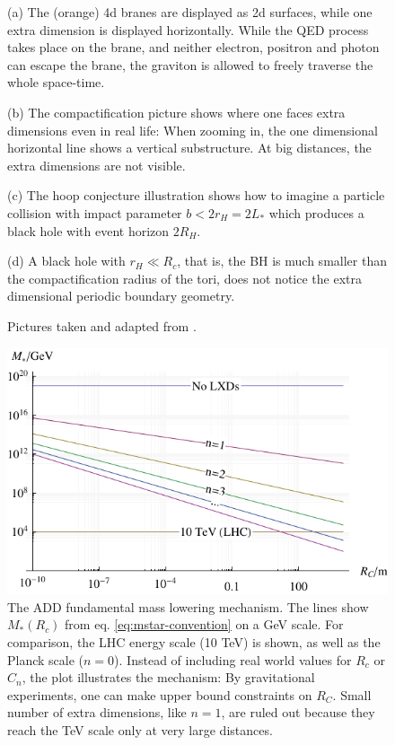 \documentclass[12pt,a4paper]{report}
\numberwithin{equation}{chapter}
\begin{document}
\begin{figure}[h!]
{(a) The (orange) 4d branes are displayed as 2d surfaces, while one extra dimension is displayed horizontally. While the QED process takes place on the brane, and neither electron, positron and photon can escape the brane, the graviton is allowed to freely traverse the whole space-time.

(b) The compactification picture shows where one faces extra dimensions even in real life: When zooming in, the one dimensional horizontal line shows a vertical substructure. At big distances, the extra dimensions are not visible.

(c) The hoop conjecture illustration shows how to imagine a particle collision with impact parameter $b<2 r_H=2 L_*$ which produces a black hole with event horizon $2R_H$.

(d) A black hole with $r_H \ll R_c$, that is, the BH is much smaller than the compactification radius of the tori, does not notice the extra dimensional periodic boundary geometry.

Pictures taken and adapted from \cite{KBH2005,cavaglia,Hossenfelder2004}.}\label{fig:lxd-1}
\end{figure}

\begin{figure}
\centering
\includegraphics[scale=1]{figures/ADD-fundamental-mass.pdf}
\caption[ADD fundamental mass lowering principle plot/illustration]{The ADD fundamental mass lowering mechanism. The lines show $M_*(R_c)$ from eq. \eqref{eq:mstar-convention} on a GeV scale. For comparison, the LHC energy scale (10 TeV) is shown, as well as the Planck scale ($n=0$). Instead of including real world values for $R_c$ or $C_n$, the plot illustrates the mechanism: By gravitational experiments, one can make upper bound constraints on $R_C$. Small number of extra dimensions, like $n=1$, are ruled out because they reach the TeV scale only at very large distances.}\label{fig:ADD-fundamental-mass}
\end{figure}
\end{document}
